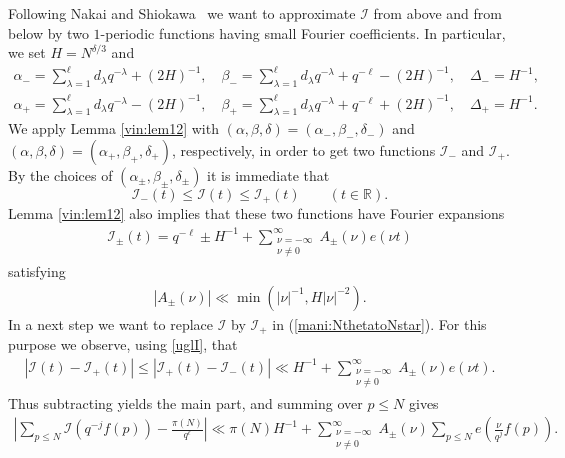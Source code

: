 \documentclass[a4paper,10pt]{amsart}
\numberwithin{equation}{section}
\theoremstyle{definition}
\theoremstyle{remark}
\renewcommand{\lvert}{\left\vert}
\renewcommand{\rvert}{\right\vert}
\begin{document}
Following Nakai and Shiokawa~\cite{Nakai_Shiokawa1990:class_normal_numbers} we
want to approximate $\mathcal{I}$ from above and from below by two $1$-periodic
functions having small Fourier coefficients. In particular, we set
$H=N^{\delta/3}$ and
\begin{equation}\label{mani:abd}
\begin{split}
\alpha_-=\sum_{\lambda=1}^\ell d_\lambda q^{-\lambda}+(2H)^{-1},\quad
\beta_-=\sum_{\lambda=1}^\ell d_\lambda q^{-\lambda}+q^{-\ell}-(2H)^{-1},\quad
\Delta_-=H^{-1},\\
\alpha_+=\sum_{\lambda=1}^\ell d_\lambda q^{-\lambda}-(2H)^{-1},\quad
\beta_+=\sum_{\lambda=1}^\ell d_\lambda q^{-\lambda}+q^{-\ell}+(2H)^{-1},\quad
\Delta_+=H^{-1}.
\end{split}
\end{equation}
We apply Lemma \ref{vin:lem12} with
$(\alpha,\beta,\delta)=(\alpha_-,\beta_-,\delta_-)$ and
$(\alpha,\beta,\delta)=(\alpha_+,\beta_+, \delta_+)$,
respectively, in order to get two functions $\mathcal{I}_-$ and
$\mathcal{I}_+$. By the choices of
$(\alpha_\pm,\beta_\pm,\delta_\pm)$ it is immediate that
\begin{equation}\label{uglI}
\mathcal{I}_-(t)\leq\mathcal{I}(t)\leq\mathcal{I}_+(t) \qquad
(t\in\mathbb{R}).
\end{equation}
Lemma \ref{vin:lem12} also implies that these two functions have
Fourier expansions
\begin{align}\label{mani:Ifourier}
\mathcal{I}_\pm(t)=q^{-\ell}\pm H^{-1}+
  \sum_{\substack{\nu=-\infty\\\nu\neq0}}^\infty A_\pm(\nu)e(\nu t)
\end{align}
satisfying
\begin{gather*}%
\lvert A_\pm(\nu)\rvert
\ll\min(\lvert\nu\rvert^{-1},H\lvert\nu\rvert^{-2}).
\end{gather*}
In a next step we want to replace $\mathcal{I}$ by $\mathcal{I}_+$
in (\ref{mani:NthetatoNstar}). For this purpose we observe, using \eqref{uglI},
that
\begin{gather*}
\lvert\mathcal{I}(t)-\mathcal{I}_+(t)\rvert \le
\lvert\mathcal{I}_+(t)-\mathcal{I}_-(t)\rvert
  \ll H^{-1} + \sum_{\substack{\nu=-\infty\\\nu\neq0}}^\infty
  A_\pm(\nu)e(\nu t).
\end{gather*}
Thus subtracting yields the main part, and summing over $p\leq N$ gives
\begin{gather}\label{mani:0.5}
\lvert\sum_{p\leq N}\mathcal{I}(q^{-j}f(p))-\frac{\pi(N)}{q^{\ell}}\rvert
\ll\pi(N)H^{-1}+\sum_{\substack{\nu=-\infty\\\nu\neq0}}^\infty
A_{\pm}(\nu)\sum_{p\leq N}e\left(\frac{\nu}{q^j}f(p)\right).
\end{gather}
\end{document}
